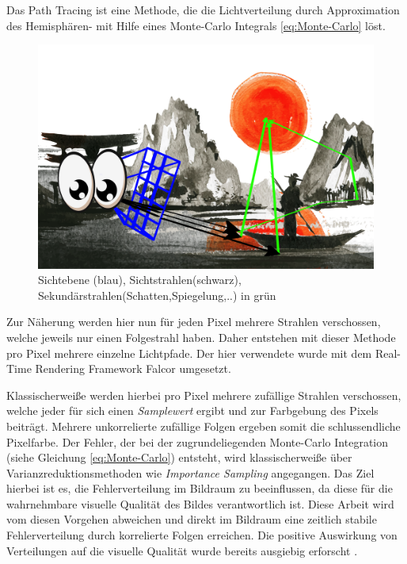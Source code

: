 Das Path Tracing ist eine Methode, die die Lichtverteilung durch Approximation des Hemisphären- mit Hilfe eines Monte-Carlo Integrals
\ref{eq:Monte-Carlo} löst. 

\begin{figure}[H]
    \begin{tcolorbox}
    \centering
    \includegraphics[width=\linewidth]{content/PathTracer/Bilder/PathTracerGuide.png}
    \end{tcolorbox}
    \caption{Sichtebene (blau), Sichtstrahlen(schwarz), Sekundärstrahlen(Schatten,Spiegelung,..) in grün}
    \label{pic::GrundkonzeptPathTracing}
\end{figure}

Zur Näherung werden hier nun für jeden Pixel mehrere Strahlen verschossen, welche jeweils nur einen Folgestrahl haben. Daher entstehen
mit dieser Methode pro Pixel mehrere einzelne Lichtpfade.
Der hier verwendete  wurde mit dem Real-Time Rendering Framework Falcor \cite{Benty18} umgesetzt.

Klassischerweiße werden hierbei pro Pixel mehrere zufällige Strahlen verschossen, welche jeder 
für sich einen \textit{Samplewert} ergibt und zur Farbgebung des Pixels beiträgt. Mehrere
unkorrelierte zufällige Folgen ergeben somit die schlussendliche Pixelfarbe. Der Fehler, der 
bei der zugrundeliegenden Monte-Carlo Integration (siehe Gleichung \ref{eq:Monte-Carlo}) entsteht, 
wird klassischerweiße über Varianzreduktionsmethoden wie \textit{Importance Sampling}
angegangen.
Das Ziel hierbei ist es, die Fehlerverteilung im Bildraum zu beeinflussen, da diese für die wahrnehmbare 
visuelle Qualität des Bildes verantwortlich ist. Diese Arbeit wird vom diesen Vorgehen abweichen und direkt im 
Bildraum eine zeitlich stabile 
Fehlerverteilung durch korrelierte Folgen erreichen. Die positive Auswirkung von  
Verteilungen auf die visuelle Qualität wurde bereits ausgiebig erforscht \cite{3288}.

